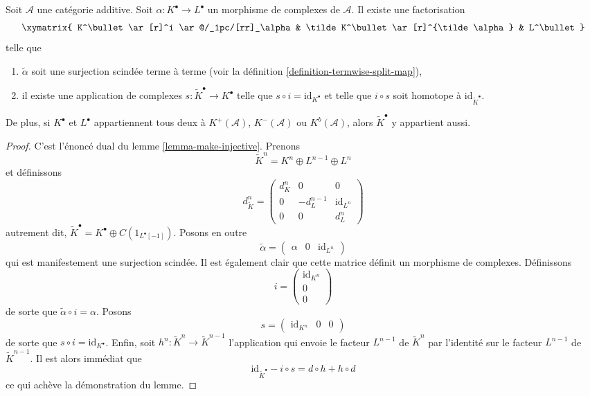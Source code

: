\begin{lemma}
\label{lemma-make-surjective}
Soit $\mathcal{A}$ une catégorie additive.
Soit $\alpha : K^\bullet \to L^\bullet$ un morphisme de complexes de
$\mathcal{A}$. Il existe une factorisation
$$
\xymatrix{
K^\bullet \ar[r]^i \ar@/_1pc/[rr]_\alpha &
\tilde K^\bullet \ar[r]^{\tilde \alpha} &
L^\bullet
}
$$
telle que
\begin{enumerate}
\item $\tilde \alpha$ soit une surjection scindée terme à terme (voir la
définition \ref{definition-termwise-split-map}),
\item il existe une application de complexes $s : \tilde K^\bullet \to K^\bullet$
telle que $s \circ i = \text{id}_{K^\bullet}$ et telle que $i \circ s$ soit
homotope à $\text{id}_{\tilde K^\bullet}$.
\end{enumerate}
De plus, si $K^\bullet$ et $L^\bullet$ appartiennent tous deux à
$K^{+}(\mathcal{A})$, $K^{-}(\mathcal{A})$ ou $K^b(\mathcal{A})$, alors
$\tilde K^\bullet$ y appartient aussi.
\end{lemma}

\begin{proof}
C'est l'énoncé dual du lemme \ref{lemma-make-injective}.
Prenons
$$
\tilde K^n = K^n \oplus L^{n - 1} \oplus L^n
$$
et définissons
$$
d^n_{\tilde K} =
\left(
\begin{matrix}
d^n_K & 0 & 0 \\
0 & - d^{n - 1}_L & \text{id}_{L^n} \\
0 & 0 & d^n_L
\end{matrix}
\right)
$$
autrement dit, $\tilde K^\bullet = K^\bullet \oplus C(1_{L^\bullet[-1]})$.
Posons en outre
$$
\tilde \alpha =
\left(
\begin{matrix}
\alpha &
0 &
\text{id}_{L^n}
\end{matrix}
\right)
$$
qui est manifestement une surjection scindée. Il est également clair que cette
matrice définit un morphisme de complexes. Définissons
$$
i =
\left(
\begin{matrix}
\text{id}_{K^n} \\
0 \\
0
\end{matrix}
\right)
$$
de sorte que $\tilde \alpha \circ i = \alpha$. Posons
$$
s =
\left(
\begin{matrix}
\text{id}_{K^n} &
0 &
0
\end{matrix}
\right)
$$
de sorte que $s \circ i = \text{id}_{K^\bullet}$. Enfin, soit
$h^n : \tilde K^n \to \tilde K^{n - 1}$ l'application qui envoie le facteur
$L^{n - 1}$ de $\tilde K^n$ par l'identité sur le facteur $L^{n - 1}$ de
$\tilde K^{n - 1}$. Il est alors immédiat que
$$
\text{id}_{\tilde K^\bullet} - i \circ s
=
d \circ h + h \circ d
$$
ce qui achève la démonstration du lemme.
\end{proof}

